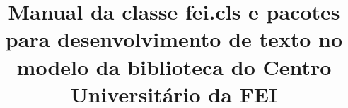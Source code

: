 \documentclass{fei}
\begin{document}
\author{}
\title{Manual da classe fei.cls e pacotes para desenvolvimento de texto no modelo da biblioteca do Centro Universitário da FEI}

\maketitle{}
\sumario{}





\bibliografia{}
\end{document}
